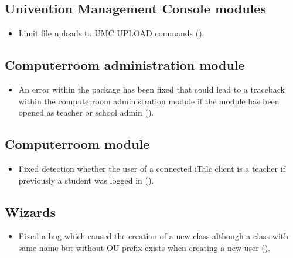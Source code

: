 \subsection{Univention Management Console modules}
\begin{itemize}
\item Limit file uploads to UMC UPLOAD commands ().
\end{itemize}


\subsection{Computerroom administration module}
\begin{itemize}
\item An error within the package  has been fixed that could lead to a traceback
  within the computerroom administration module if the module has been opened as teacher or school admin ().
\end{itemize}

\subsection{Computerroom module}
\begin{itemize}
\item Fixed detection whether the user of a connected iTalc client is a teacher if previously a student was logged in ().
\end{itemize}

\subsection{Wizards}
\begin{itemize}
\item Fixed a bug which caused the creation of a new class although a class with same name but without OU prefix exists when creating a new user ().
\end{itemize}




